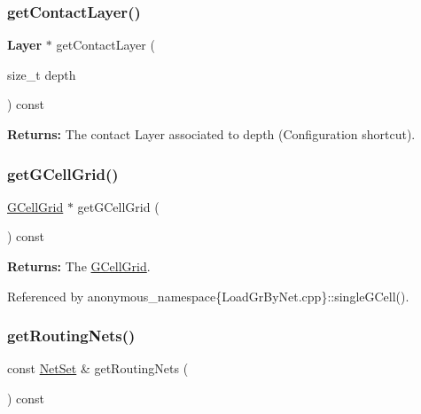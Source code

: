 \subsubsection{\texorpdfstring{get\+Contact\+Layer()}{getContactLayer()}}
{\footnotesize\ttfamily \textbf{ Layer} $\ast$ get\+Contact\+Layer (\begin{DoxyParamCaption}\item[{size\+\_\+t}]{depth }\end{DoxyParamCaption}) const\hspace{0.3cm}{\ttfamily [inline]}}

{\bfseries Returns\+:} The contact Layer associated to {\ttfamily depth} (Configuration shortcut). \mbox{\label{classKatabatic_1_1KatabaticEngine_a9a56286f633fddd702d66563de457a4a}} 
\subsubsection{\texorpdfstring{get\+G\+Cell\+Grid()}{getGCellGrid()}}
{\footnotesize\ttfamily \hyperlink{classKatabatic_1_1GCellGrid}{G\+Cell\+Grid} $\ast$ get\+G\+Cell\+Grid (\begin{DoxyParamCaption}{ }\end{DoxyParamCaption}) const\hspace{0.3cm}{\ttfamily [inline]}}

{\bfseries Returns\+:} The \hyperlink{classKatabatic_1_1GCellGrid}{G\+Cell\+Grid}. 

Referenced by anonymous\+\_\+namespace\{\+Load\+Gr\+By\+Net.\+cpp\}\+::single\+G\+Cell().

\mbox{\label{classKatabatic_1_1KatabaticEngine_a8f661928f8f709552c8486d68ac33c55}} 
\subsubsection{\texorpdfstring{get\+Routing\+Nets()}{getRoutingNets()}}
{\footnotesize\ttfamily const \hyperlink{classKatabatic_1_1KatabaticEngine_a92ed88f9aecd2f195089c4029fa8bcc7}{Net\+Set} \& get\+Routing\+Nets (\begin{DoxyParamCaption}{ }\end{DoxyParamCaption}) const\hspace{0.3cm}{\ttfamily [inline]}}


